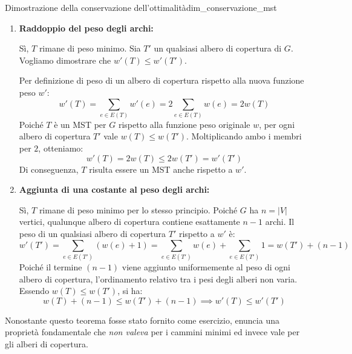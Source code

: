 \documentclass[12pt]{report}
\begin{document}
	\begin{dimostrazione}{Dimostrazione della conservazione dell'ottimalità}{dim_conservazione_mst}
		\begin{enumerate}
			\item \textbf{Raddoppio del peso degli archi:}
			
			Sì, $T$ rimane di peso minimo. Sia $T'$ un qualsiasi albero di copertura di $G$. Vogliamo dimostrare che $w'(T) \le w'(T')$.
			
			Per definizione di peso di un albero di copertura rispetto alla nuova funzione peso $w'$:
			\[
			w'(T) = \sum_{e \in E(T)} w'(e) = 2 \sum_{e \in E(T)} w(e) = 2 w(T)
			\]
			Poiché $T$ è un MST per $G$ rispetto alla funzione peso originale $w$, per ogni albero di copertura $T'$ vale $w(T) \le w(T')$. Moltiplicando ambo i membri per $2$, otteniamo:
			\[
			w'(T) = 2 w(T) \le 2 w(T') = w'(T')
			\]
			Di conseguenza, $T$ risulta essere un MST anche rispetto a $w'$.
			
			\item \textbf{Aggiunta di una costante al peso degli archi:}
			
			Sì, $T$ rimane di peso minimo per lo stesso principio. Poiché $G$ ha $n = |V|$ vertici, qualunque albero di copertura contiene esattamente $n - 1$ archi. Il peso di un qualsiasi albero di copertura $T'$ rispetto a $w'$ è:
			\[
			w'(T') = \sum_{e \in E(T')} (w(e) + 1) = \sum_{e \in E(T')} w(e) + \sum_{e \in E(T')} 1 = w(T') + (n - 1)
			\]
			Poiché il termine $(n - 1)$ viene aggiunto uniformemente al peso di ogni albero di copertura, l'ordinamento relativo tra i pesi degli alberi non varia. Essendo $w(T) \le w(T')$, si ha:
			\[
			w(T) + (n - 1) \le w(T') + (n - 1) \implies w'(T) \le w'(T')
			\]
		\end{enumerate}
	\end{dimostrazione}
	Nonostante questo teorema fosse stato fornito come esercizio, enuncia una proprietà fondamentale che \textit{non valeva} per i cammini minimi ed invece vale per gli alberi di copertura.
	
\end{document}
